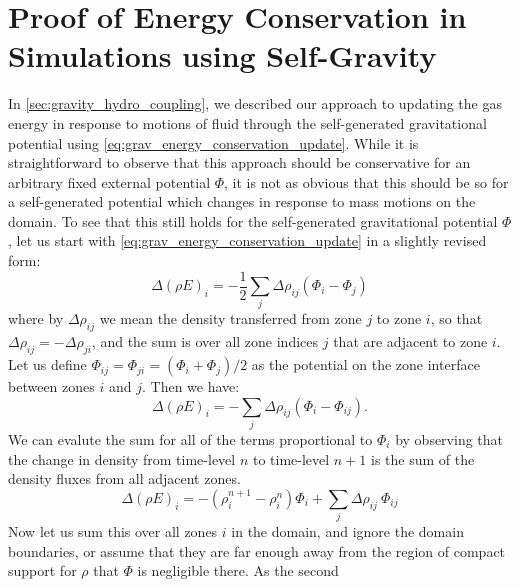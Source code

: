 \documentclass[12pt]{article}
\begin{document}
\newpage




\newpage

\appendix



\section{Proof of Energy Conservation in Simulations using Self-Gravity}
\label{app:gravity}

In \autoref{sec:gravity_hydro_coupling}, we described our approach to updating the gas energy
in response to motions of fluid through the self-generated gravitational potential using
\autoref{eq:grav_energy_conservation_update}. While it is straightforward to observe that this approach
should be conservative for an arbitrary fixed external potential $\Phi$, it is not as obvious that this
should be so for a self-generated potential which changes in response to mass motions on the domain. To
see that this still holds for the self-generated gravitational potential $\Phi$, let us start with
\autoref{eq:grav_energy_conservation_update} in a slightly revised form:
\begin{equation}
  \Delta(\rho E)_i = -\frac{1}{2}\sum_{j} \Delta\rho_{ij}(\Phi_i - \Phi_{j}) \label{eq:grav_energy_conservation_update_revised}
\end{equation}
where by $\Delta \rho_{ij}$ we mean the density transferred from zone $j$ to zone $i$, so that
$\Delta \rho_{ij} = - \Delta \rho_{ji}$, and the sum is over all zone indices $j$ that are adjacent
to zone $i$. Let us define $\Phi_{ij} = \Phi_{ji} = (\Phi_{i} + \Phi_{j}) / 2$ as the potential on the
zone interface between zones $i$ and $j$. Then we have:
\begin{equation}
  \Delta(\rho E)_i = -\sum_{j} \Delta\rho_{ij}(\Phi_i - \Phi_{ij}).
\end{equation}
We can evalute the sum for all of the terms proportional to $\Phi_i$ by observing that the change in
density from time-level $n$ to time-level $n+1$ is the sum of the density fluxes from all adjacent zones.
\begin{equation*}
  \Delta(\rho E)_i = - (\rho_i^{n+1} - \rho_i^{n}) \Phi_i + \sum_{j}\Delta \rho_{ij} \ \Phi_{ij}
\end{equation*}
Now let us sum this over all zones $i$ in the domain, and ignore the domain boundaries, or assume that they are
far enough away from the region of compact support for $\rho$ that $\Phi$ is negligible there. As the second
\end{document}
